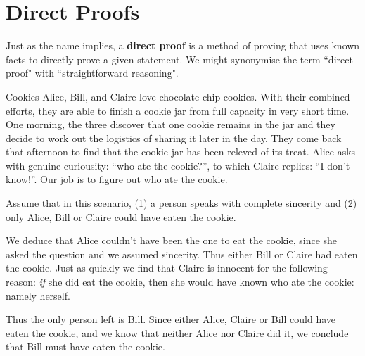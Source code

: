 \documentclass[../proofs.tex]{subfiles}
\begin{document}
\chapter{Direct Proofs}
 Just as the name implies, a \textbf{direct proof} is a method of proving that
 uses known facts to directly prove a given statement. We might synonymise the
 term ``direct proof" with ``straightforward reasoning".
  
 \begin{expl}{ Cookies }
  Alice, Bill, and Claire love chocolate-chip cookies. With their
  combined efforts, they are able to finish a cookie jar from full
  capacity in very short time. One morning, the three discover that
  one cookie remains in the jar and they decide to work out the
  logistics of sharing it later in the day. They come back that
  afternoon to find that the cookie jar has been releved of its treat.
  Alice asks with genuine curiousity: ``who ate the cookie?'', 
  to which Claire replies: ``I don't know!''. Our job is to figure out
  who ate the cookie.

  Assume that in this scenario, (1) a person speaks with complete sincerity
  and (2) only Alice, Bill or Claire could have eaten the cookie. 
  
  We deduce that Alice couldn't have been the one to eat the cookie, since
  she asked the question and we assumed sincerity. Thus either Bill or Claire
  had eaten the cookie. Just as quickly we find that Claire is innocent
  for the following reason: \emph{if} she did eat the cookie, then she would
  have known who ate the cookie: namely herself. 
  
  Thus the only person left is Bill. Since either Alice, Claire or Bill
  could have eaten the cookie, and we know that neither Alice nor Claire
  did it, we conclude that Bill must have eaten the cookie. 
 \end{expl}
\end{document}
